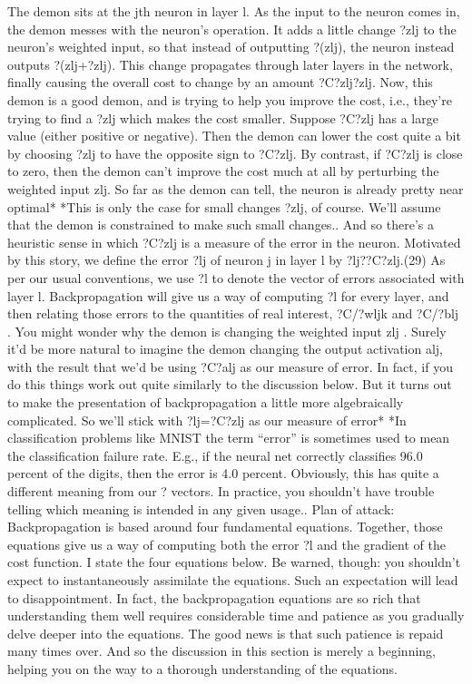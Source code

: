 The demon sits at the jth neuron in layer l. As the input to the neuron comes in, the demon messes with the neuron's operation. It adds a little change ?zlj to the neuron's weighted input, so that instead of outputting ?(zlj), the neuron instead outputs ?(zlj+?zlj). This change propagates through later layers in the network, finally causing the overall cost to change by an amount ?C?zlj?zlj.
Now, this demon is a good demon, and is trying to help you improve the cost, i.e., they're trying to find a ?zlj
which makes the cost smaller. Suppose ?C?zlj has a large value (either positive or negative). Then the demon can lower the cost quite a bit by choosing ?zlj to have the opposite sign to ?C?zlj. By contrast, if ?C?zlj is close to zero, then the demon can't improve the cost much at all by perturbing the weighted input zlj. So far as the demon can tell, the neuron is already pretty near optimal* *This is only the case for small changes ?zlj, of course. We'll assume that the demon is constrained to make such small changes.. And so there's a heuristic sense in which ?C?zlj
is a measure of the error in the neuron.
Motivated by this story, we define the error ?lj
of neuron j in layer l by 
?lj??C?zlj.(29)
As per our usual conventions, we use ?l to denote the vector of errors associated with layer l. Backpropagation will give us a way of computing ?l for every layer, and then relating those errors to the quantities of real interest, ?C/?wljk and ?C/?blj
.
You might wonder why the demon is changing the weighted input zlj
. Surely it'd be more natural to imagine the demon changing the output activation alj, with the result that we'd be using ?C?alj as our measure of error. In fact, if you do this things work out quite similarly to the discussion below. But it turns out to make the presentation of backpropagation a little more algebraically complicated. So we'll stick with ?lj=?C?zlj as our measure of error* *In classification problems like MNIST the term ``error'' is sometimes used to mean the classification failure rate. E.g., if the neural net correctly classifies 96.0 percent of the digits, then the error is 4.0 percent. Obviously, this has quite a different meaning from our ?
vectors. In practice, you shouldn't have trouble telling which meaning is intended in any given usage..
Plan of attack: Backpropagation is based around four fundamental equations. Together, those equations give us a way of computing both the error ?l
and the gradient of the cost function. I state the four equations below. Be warned, though: you shouldn't expect to instantaneously assimilate the equations. Such an expectation will lead to disappointment. In fact, the backpropagation equations are so rich that understanding them well requires considerable time and patience as you gradually delve deeper into the equations. The good news is that such patience is repaid many times over. And so the discussion in this section is merely a beginning, helping you on the way to a thorough understanding of the equations.
